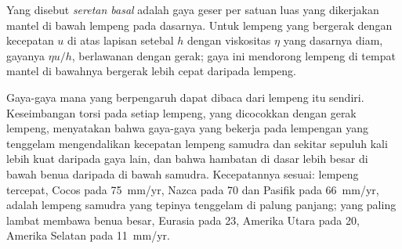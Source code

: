\begin{omfigure}

\par{}\label{fig:b3:mantle-convection:ridge-push}
\end{omfigure}

\begin{definition}\label{def:b3:mantle-convection:basal-drag}
Yang disebut \emph{seretan basal} adalah gaya geser per satuan luas yang
dikerjakan mantel di bawah lempeng pada dasarnya. Untuk lempeng yang bergerak dengan kecepatan $u$
di atas lapisan setebal $h$ dengan viskositas $\eta$ yang dasarnya diam, gayanya
$\eta u/h$, berlawanan dengan gerak; gaya ini mendorong lempeng di tempat mantel di bawahnya
bergerak lebih cepat daripada lempeng.
\end{definition}

Gaya-gaya mana yang berpengaruh dapat dibaca dari lempeng itu sendiri. Keseimbangan torsi
pada setiap lempeng, yang dicocokkan dengan gerak lempeng, menyatakan bahwa gaya-gaya yang bekerja pada
lempengan yang tenggelam mengendalikan kecepatan lempeng samudra dan sekitar sepuluh kali
lebih kuat daripada gaya lain, dan bahwa hambatan di dasar lebih besar di bawah
benua daripada di bawah samudra. Kecepatannya sesuai: lempeng tercepat, Cocos pada
\qty{75}{mm/yr}, Nazca pada 70 dan Pasifik pada \qty{66}{mm/yr}, adalah lempeng samudra
yang tepinya tenggelam di palung panjang; yang paling lambat membawa benua besar,
Eurasia pada 23, Amerika Utara pada 20, Amerika Selatan pada \qty{11}{mm/yr}.

